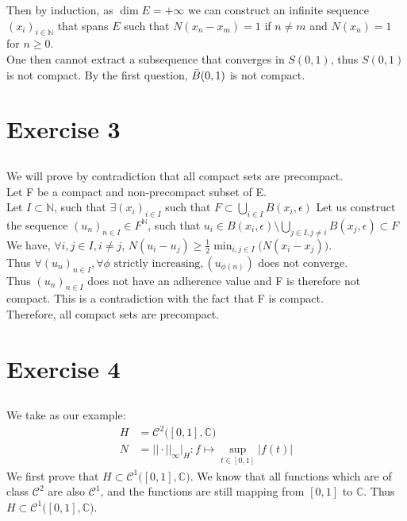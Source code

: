 \documentclass{article}
\begin{document}
\noindent Then by induction, as $\dim E = + \infty$ we can construct an infinite sequence $(x_i)_{i \in \mathbb{N}}$ that spans $E$ such that $N(x_n - x_m) = 1$ if $n \neq m$ and $N(x_n) = 1$ for $n \geq 0$.\\

\noindent One then cannot extract a subsequence that converges in $S(0,1)$, thus $S(0,1)$ is not compact. By the first question, $\Bar{B}(0,1)$ is not compact. 


\section{Exercise 3}
\subsection{} %
We will prove by contradiction that all compact sets are precompact. \\

\noindent Let F be a compact and non-precompact subset of E.\\
Let $I \subset \mathbb{N}$, such that $\exists (x_i)_{i \in I}$ such that $F\subset\bigcup\limits_{i\in I}B(x_i, \epsilon)$ 
Let us construct the sequence $(u_n)_{n \in I} \in F^{\mathbb{N}}$, such that $u_i \in B(x_i,\epsilon) \setminus \bigcup \limits_{j\in I, j \neq i}B(x_j, \epsilon) \subset F$ \\
We have, $\forall i,j \in I,i \neq j$, $N(u_i-u_j) \geq \frac{1}{2} \min_{i,j \in I}\big( N(x_i-x_j)\big)$.\\
Thus $\forall (u_n)_{n \in I}, \forall \phi \text{ strictly increasing}, (u_{\phi(n)})$ does not converge.\\
Thus $(u_n)_{n \in I}$ does not have an adherence value and F is therefore not compact. This is a contradiction with the fact that F is compact.\\
Therefore, all compact sets are precompact.\\


\section{Exercise 4}
\subsection{} %
We take as our example:
\begin{align*}
	H &= \mathcal{C}^2\big( [0,1] , \mathbb{C} \big)\\
	N &= ||\cdot || _{\infty} \big|_{H} : f \mapsto \sup_{t \in [0,1]} |f(t)|
\end{align*}
We first prove that $H \subset \mathcal{C}^1\big( [0,1] , \mathbb{C} \big)$. We know that all functions which are of class $\mathcal{C}^2$ are also $\mathcal{C}^1$, and the functions are still mapping from $[0,1]$ to $\mathbb{C}$. Thus $H \subset \mathcal{C}^1\big( [0,1] , \mathbb{C} \big)$.\\
\end{document}
